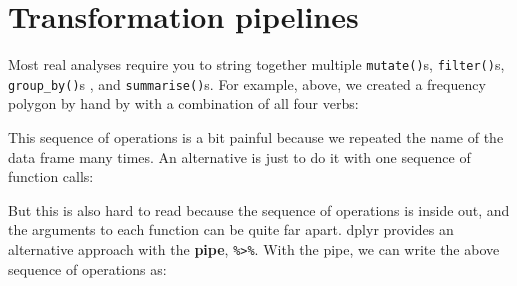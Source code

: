 \section{Transformation pipelines}

Most real analyses require you to string together multiple
\texttt{mutate()}s, \texttt{filter()}s, \texttt{group\_by()}s , and
\texttt{summarise()}s. For example, above, we created a frequency
polygon by hand by with a combination of all four verbs: \indexc{\%>\%}

\begin{Shaded}
\begin{Highlighting}[]
\StringTok{ }
\StringTok{ } \NormalTok{())}
\StringTok{ }\StringTok{ }\StringTok{ }\NormalTok{)}
\StringTok{ } \StringTok{ }
\end{Highlighting}
\end{Shaded}

This sequence of operations is a bit painful because we repeated the
name of the data frame many times. An alternative is just to do it with
one sequence of function calls:

\begin{Shaded}
\begin{Highlighting}[]
\NormalTok{(}
  \NormalTok{(}
    \NormalTok{(}
      \NormalTok{(}
      \NormalTok{), }
       \NormalTok{()}
    \NormalTok{), }
    \StringTok{ }\NormalTok{, }
    \StringTok{ }
  \NormalTok{), }
   \StringTok{ }
\NormalTok{)}
\end{Highlighting}
\end{Shaded}

But this is also hard to read because the sequence of operations is
inside out, and the arguments to each function can be quite far apart.
dplyr provides an alternative approach with the \textbf{pipe},
\texttt{\%\textgreater{}\%}. With the pipe, we can write the above
sequence of operations as:

